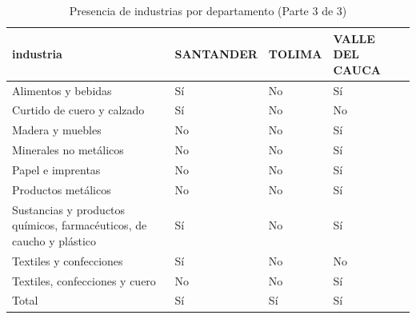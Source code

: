 \documentclass[12pt]{article}
\begin{document}
\setcounter{table}{3}
\begin{table}[htbp]
\centering
\large

\caption{Presencia de industrias por departamento (Parte 3 de 3)}
\begin{tabular}[t]{llll}
\toprule
industria & SANTANDER & TOLIMA & VALLE DEL CAUCA\\
\midrule
Alimentos y bebidas & Sí & No & Sí\\
Curtido de cuero y calzado & Sí & No & No\\
Madera y muebles & No & No & Sí\\
Minerales no metálicos & No & No & Sí\\
Papel e imprentas & No & No & Sí\\
\addlinespace
Productos metálicos & No & No & Sí\\
Sustancias y productos químicos, farmacéuticos, de caucho y plástico & Sí & No & Sí\\
Textiles y confecciones & Sí & No & No\\
Textiles, confecciones y cuero & No & No & Sí\\
Total & Sí & Sí & Sí\\
\bottomrule
\end{tabular}
\end{table}
\end{document}
